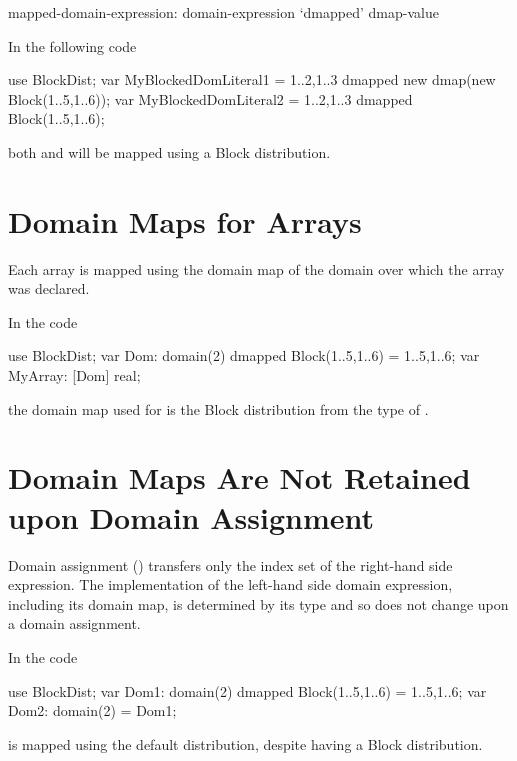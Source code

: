 \begin{syntax}
mapped-domain-expression:
  domain-expression `dmapped' dmap-value
\end{syntax}

\begin{example}
In the following code
\begin{chapel}
use BlockDist;
var MyBlockedDomLiteral1 = {1..2,1..3} dmapped new dmap(new Block({1..5,1..6}));
var MyBlockedDomLiteral2 = {1..2,1..3} dmapped Block({1..5,1..6});
\end{chapel}
both  and 
will be mapped using a Block distribution.
\end{example}


\section{Domain Maps for Arrays}
\label{Domain_Maps_For_Arrays}

Each array is mapped using the domain map of the domain
over which the array was declared.

\begin{example}
In the code
\begin{chapel}
use BlockDist;
var Dom: domain(2) dmapped Block({1..5,1..6}) = {1..5,1..6};
var MyArray: [Dom] real;
\end{chapel}
the domain map used for  is the Block
distribution from the type of .
\end{example}

\section{Domain Maps Are Not Retained upon Domain Assignment}
\label{Domain_Maps_Not_Assigned}

Domain assignment () transfers only the index
set of the right-hand side expression. The implementation of the
left-hand side domain expression, including its domain map, is
determined by its type and so does not change upon a domain assignment.

\begin{example}
In the code
\begin{chapel}
use BlockDist;
var Dom1: domain(2) dmapped Block({1..5,1..6}) = {1..5,1..6};
var Dom2: domain(2) = Dom1;
\end{chapel}
 is mapped using the default distribution, despite
 having a Block distribution.
\end{example}

